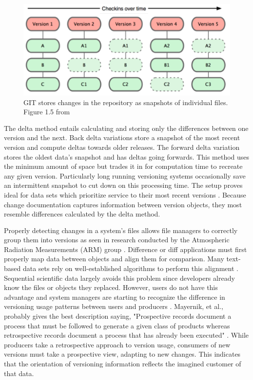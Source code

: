 \begin{figure}
	\centering
	\includegraphics[scale=0.50]{figures/GITFiles.png}
	\caption[GIT stores changes in the repository as snapshots of individual files.]{GIT stores changes in the repository as snapshots of individual files. Figure 1.5 from \cite{Chacon:2009:PG:1618548}}
	\label{GITFile}
\end{figure}

The delta method entails calculating and storing only the differences between one version and the next.
Back delta variations store a snapshot of the most recent version and compute deltas towards older releases.
The forward delta variation stores the oldest data's snapshot and has deltas going forwards.
This method uses the minimum amount of space but trades it in for computation time to recreate any given version.
Particularly long running versioning systems occasionally save an intermittent snapshot to cut down on this processing time.
The setup proves ideal for data sets which prioritize service to their most recent versions \cite{Stuckenholz:2005:CEV:1039174.1039197}.
Because change documentation captures information between version objects, they most resemble differences calculated by the delta method.

Properly detecting changes in a system's files allows file managers to correctly group them into versions as seen in research conducted by the Atmospheric Radiation Measurements (ARM) group \cite{6906868}.
Difference or diff applications must first properly map data between objects and align them for comparison.
Many text-based data sets rely on well-established algorithms to perform this alignment  \cite{Chien:2000:VMX:646544.696357} \cite{Hartung201315}.
Sequential scientific data largely avoids this problem since developers already know the files or objects they replaced.
However, users do not have this advantage and system managers are starting to recognize the difference in versioning usage patterns between users and producers \cite{Branco2008}.
Mayernik, et al., probably gives the best description saying, "Prospective records document a process that must be followed to generate a given class of products whereas retrospective records document a process that has already been executed" \cite{MatthewS.Mayernik201312-039}.
While producers take a retrospective approach to version usage, consumers of new versions must take a prospective view, adapting to new changes.
This indicates that the orientation of versioning information reflects the imagined customer of that data.


